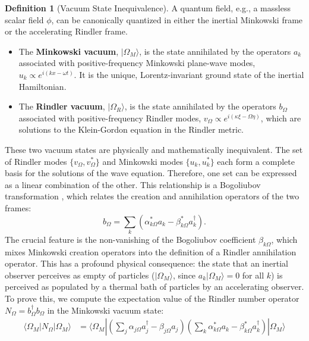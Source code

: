 \documentclass[11pt, letterpaper]{report}
\theoremstyle{plain} %
\theoremstyle{definition} %
\newtheorem{definition}{Definition}[chapter]
\theoremstyle{remark} %
\begin{document}
\begin{definition}[Vacuum State Inequivalence]
\label{def:vacuum_inequivalence}
A quantum field, e.g., a massless scalar field $\phi$, can be canonically quantized in either the inertial Minkowski frame or the accelerating Rindler frame.
\begin{itemize}
    \item The \textbf{Minkowski vacuum}, $|\Omega_M\rangle$, is the state annihilated by the operators $a_k$ associated with positive-frequency Minkowski plane-wave modes, $u_k \propto e^{i(kx-\omega t)}$. It is the unique, Lorentz-invariant ground state of the inertial Hamiltonian.
    \item The \textbf{Rindler vacuum}, $|\Omega_R\rangle$, is the state annihilated by the operators $b_\Omega$ associated with positive-frequency Rindler modes, $v_\Omega \propto e^{i(\kappa\xi-\Omega\eta)}$, which are solutions to the Klein-Gordon equation in the Rindler metric.
\end{itemize}
These two vacuum states are physically and mathematically inequivalent. The set of Rindler modes $\{v_\Omega, v_\Omega^*\}$ and Minkowski modes $\{u_k, u_k^*\}$ each form a complete basis for the solutions of the wave equation. Therefore, one set can be expressed as a linear combination of the other. This relationship is a Bogoliubov transformation \cite{Fulling1973, BirrellDavies1982}, which relates the creation and annihilation operators of the two frames:
\begin{equation}
    b_\Omega = \sum_k (\alpha_{k\Omega}^* a_k - \beta_{k\Omega}^* a_k^\dagger).
    \label{eq:bogoliubov_final_operator}
\end{equation}
The crucial feature is the non-vanishing of the Bogoliubov coefficient $\beta_{k\Omega}$, which mixes Minkowski creation operators into the definition of a Rindler annihilation operator. This has a profound physical consequence: the state that an inertial observer perceives as empty of particles ($|\Omega_M\rangle$, since $a_k|\Omega_M\rangle = 0$ for all $k$) is perceived as populated by a thermal bath of particles by an accelerating observer. To prove this, we compute the expectation value of the Rindler number operator $N_\Omega = b_\Omega^\dagger b_\Omega$ in the Minkowski vacuum state:
\begin{align}
    \langle \Omega_M | N_\Omega | \Omega_M \rangle &= \langle \Omega_M | \left(\sum_j \alpha_{j\Omega} a_j^\dagger - \beta_{j\Omega} a_j\right) \left(\sum_k \alpha_{k\Omega}^* a_k - \beta_{k\Omega}^* a_k^\dagger\right) | \Omega_M \rangle \nonumber \\

\end{align}
\end{definition}
\end{document}
